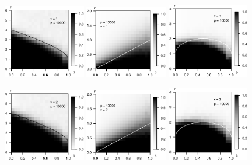 \begin{figure}
	\centering
	\includegraphics[width=0.32\textwidth]{sim_strong_boundary/simulated_strong_boundary_chi-squared_nu1_p10000.eps}
    \includegraphics[width=0.32\textwidth]{sim_weak_boundary/simulated_weak_boundary_chi-squared_nu1_p10000.eps}
    \includegraphics[width=0.32\textwidth]{sim_approx-exact_boundary/simulated_approx-exact_boundary_chi-squared_nu1_p10000.eps}
    
	\includegraphics[width=0.32\textwidth]{sim_strong_boundary/simulated_strong_boundary_chi-squared_nu2_p10000.eps}
    \includegraphics[width=0.32\textwidth]{sim_weak_boundary/simulated_weak_boundary_chi-squared_nu2_p10000.eps}
    \includegraphics[width=0.32\textwidth]{sim_approx-exact_boundary/simulated_approx-exact_boundary_chi-squared_nu2_p10000.eps}
	

\end{figure}
